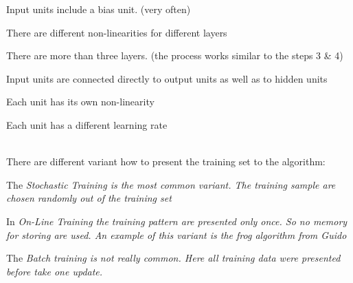  \begin{minipage}{8cm}
 \begin{liste}
   \item Input units include a bias unit. (very often)
   \item There are different non-linearities for different layers
   \item There are more than three layers. (the process works similar to the steps 3 \& 4)
   \item Input units are connected directly to output units as well as to hidden units
   \item Each unit has its own non-linearity
   \item Each unit has a different learning rate
 \end{liste}
 
 \end{minipage}
 \begin{minipage}{10cm}
 \\
 There are different variant how to present the training set to the algorithm:\\
 \begin{liste}
   \item The \em Stochastic Training \em is the most common variant. The training sample are chosen randomly out of the training set\\
   \item In \em On-Line Training \em the training pattern are presented only once. So no memory for storing are used. An example of this variant is the frog algorithm from Guido\\
   \item The \em Batch training \em is not really common. Here all training data were presented before take one update.\\
 \end{liste}
 \end{minipage}
 
